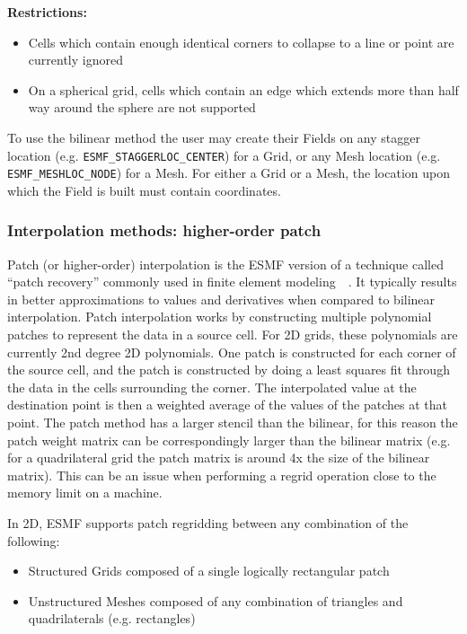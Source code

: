 \smallskip

{\bf Restrictions:}
 \begin{itemize}
 \item Cells which contain enough identical corners to collapse to a line or point are currently ignored
 \item On a spherical grid, cells which contain an edge which extends more than half way around the sphere are not supported 
 \end{itemize}

 To use the bilinear method the user may create their Fields on any stagger location (e.g. {\tt ESMF\_STAGGERLOC\_CENTER}) for a Grid, or
 any Mesh location (e.g. {\tt ESMF\_MESHLOC\_NODE}) for a Mesh. For either a Grid or a Mesh, the location upon which the Field is built 
 must contain coordinates. 

\subsubsection{Interpolation methods: higher-order patch}\label{sec:interpolation:patch}

 Patch (or higher-order) interpolation is the ESMF version of a technique called ``patch recovery'' commonly
 used in finite element modeling~\cite{PatchInterp1}~\cite{PatchInterp2}. It typically results in better approximations to 
 values and derivatives when compared to bilinear interpolation.
 Patch interpolation works by constructing multiple polynomial patches to represent
 the data in a source cell. For 2D grids, these polynomials
 are currently 2nd degree 2D polynomials. One patch is constructed for each corner of the source cell, and the patch is constructed 
 by doing a least squares fit through the data in the cells surrounding the corner. The interpolated value at the destination point is 
 then a weighted average of the values of the patches at that point. The patch method has a larger
 stencil than the bilinear, for this reason the patch weight matrix can be correspondingly larger
 than the bilinear matrix (e.g. for a quadrilateral grid the patch matrix is around 4x the size of
 the bilinear matrix). This can be an issue when performing a regrid operation close to the memory
 limit on a machine.  

\smallskip

 In 2D, ESMF supports patch regridding between any combination of the following:
 \begin{itemize}
 \item Structured Grids composed of a single logically rectangular patch
 \item Unstructured Meshes composed of any combination of triangles and quadrilaterals (e.g. rectangles)
 \end{itemize}

